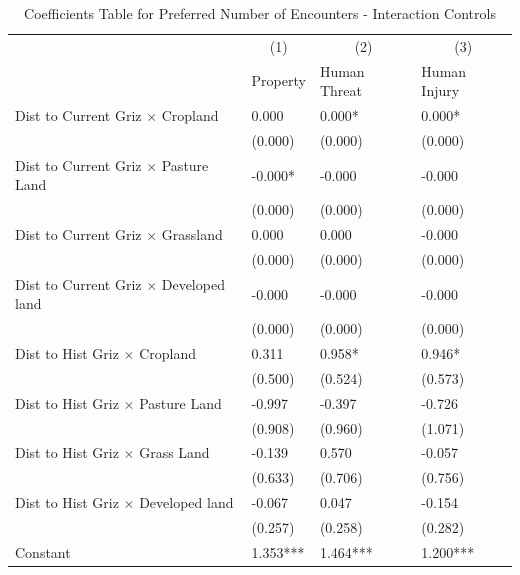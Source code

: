 \documentclass[english,12pt]{article}
\begin{document}
\begin{table}[H]
    \centering
    \caption{Coefficients Table for Preferred Number of Encounters - Interaction Controls}
    \footnotesize
    \begin{tabular}{@{}llll@{}}
        \toprule
                           &\multicolumn{1}{c}{(1)}   &\multicolumn{1}{c}{(2)}   &\multicolumn{1}{c}{(3)}  \\
                           & Property & Human Threat & Human Injury \\ \midrule
        Dist to Current Griz $\times$ Cropland&       0.000   &       0.000*  &       0.000*  \\
                    &     (0.000)   &     (0.000)   &     (0.000)   \\
        Dist to Current Griz $\times$ Pasture Land&      -0.000*  &      -0.000   &      -0.000   \\
                    &     (0.000)   &     (0.000)   &     (0.000)   \\
        Dist to Current Griz $\times$ Grassland&       0.000   &       0.000   &      -0.000   \\
                    &     (0.000)   &     (0.000)   &     (0.000)   \\
        Dist to Current Griz $\times$ Developed land&      -0.000   &      -0.000   &      -0.000   \\
                    &     (0.000)   &     (0.000)   &     (0.000)   \\
        Dist to Hist Griz $\times$ Cropland&       0.311   &       0.958*  &       0.946*  \\
                    &     (0.500)   &     (0.524)   &     (0.573)   \\
        Dist to Hist Griz $\times$ Pasture Land&      -0.997   &      -0.397   &      -0.726   \\
                    &     (0.908)   &     (0.960)   &     (1.071)   \\
        Dist to Hist Griz $\times$ Grass Land&      -0.139   &       0.570   &      -0.057   \\
                    &     (0.633)   &     (0.706)   &     (0.756)   \\
        Dist to Hist Griz $\times$ Developed land&      -0.067   &       0.047   &      -0.154   \\
                    &     (0.257)   &     (0.258)   &     (0.282)   \\\midrule                       
        Constant    &       1.353***&       1.464***&       1.200***\\

\end{tabular}
\end{table}
\end{document}
